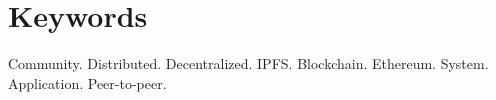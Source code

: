 \section{Keywords}

Community. Distributed. Decentralized. IPFS. Blockchain. Ethereum. System. Application. Peer-to-peer.